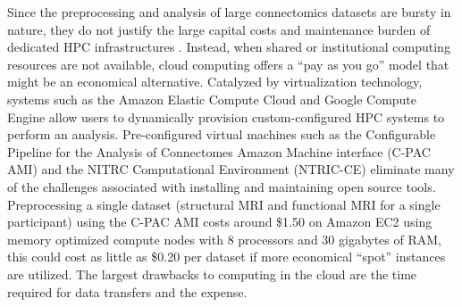 \documentclass{bmcart}
\def\marker{%
    \vadjust{{%
	\llap{\smash{%
	    \color{purple}%
	    \scalebox{1.8}{$\filledmedtriangleright$}}\;}%
    }}\hspace*{-.1ex}%
}%
\begin{document}
Since \marker{the} preprocessing and analysis of large connectomics datasets are bursty in nature, they do not justify the large capital costs and maintenance burden of dedicated HPC infrastructures \cite{ODriscoll2013}. Instead, when shared or institutional computing resources are not available, cloud computing offers a ``pay as you go'' model that might be an economical alternative. Catalyzed by virtualization technology, systems such as the Amazon Elastic Compute Cloud and Google Compute Engine allow users to dynamically provision custom-configured HPC systems to perform an analysis. Pre-configured virtual machines such as the Configurable Pipeline for the Analysis of Connectomes Amazon Machine interface (C-PAC AMI) \cite{CPAC_AMI2014}  and the NITRC Computational Environment (NTRIC-CE) \cite{NITRC_CE2014} eliminate many of the challenges associated with installing and maintaining open source tools.  Preprocessing a single dataset (structural MRI and functional MRI for a single participant) using the C-PAC AMI costs around \$1.50 on Amazon EC2 using memory optimized compute nodes with 8 processors and 30 gigabytes of RAM, this could cost as little as \$0.20 per dataset if more economical ``spot'' instances are utilized. The largest drawbacks to computing in the cloud are the time required for data transfers and the expense.
\end{document}
